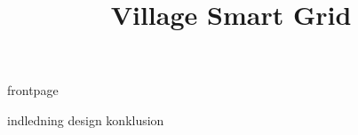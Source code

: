 \documentclass[a4paper]{article}								%
\title{Village Smart Grid}
\begin{document}

	{frontpage}

	\tableofcontents\thispagestyle{fancy} \newpage


	{indledning} \newpage
	{design} \newpage
	{konklusion} \newpage


\end{document}
